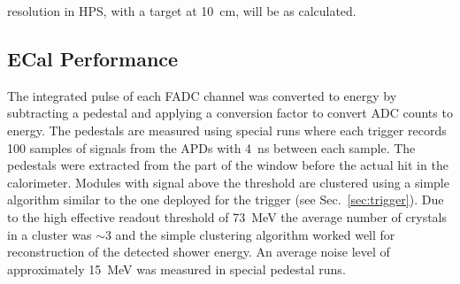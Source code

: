 \documentclass[final,3p,times,twocolumn]{elsarticle}
\begin{document}
resolution in HPS, with a target at 10~cm, will be as calculated.



\subsection{ECal Performance}
\label{sec:ecal_calibration}

The integrated pulse of each FADC channel was converted to energy by  
subtracting a pedestal and applying a conversion factor to convert ADC counts to energy. 
The pedestals are measured using special runs where each trigger records 100 samples of signals 
from the APDs with 4~ns between each sample. The pedestals were extracted from the 
part of the window before the actual hit in the calorimeter. Modules with signal above the threshold  
are clustered using a simple algorithm similar to the one 
deployed for the trigger (see Sec.~\ref{sec:trigger}). Due to the high effective readout threshold of 
73~MeV the average number of crystals in a cluster was $\sim 3$ and the simple clustering 
algorithm worked well for reconstruction of the detected shower energy. An average noise level of 
approximately 15~MeV was measured in special pedestal runs. 
\end{document}
